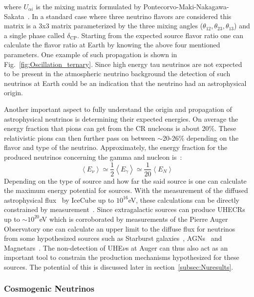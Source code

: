 where $U_{\alpha i}$ is the mixing matrix formulated by Pontecorvo-Maki-Nakagawa-Sakata~\cite{Pontecorvo:1957qd,10.1143/PTP.28.870}. In a standard case where three neutrino flavors are considered this matrix is a 3x3 matrix parameterized by the three mixing angles ($\theta_{12},\theta_{23},\theta_{13}$) and a single phase called $\delta_{\text{CP}}$. Starting from the expected source flavor ratio one can calculate the flavor ratio at Earth by knowing the above four mentioned parameters. One example of such propagation is shown in Fig.~\ref{fig:Oscillation_ternary}. Since high energy tau neutrinos are not expected to be present in the atmospheric neutrino background the detection of such neutrinos at Earth could be an indication that the neutrino had an astrophysical origin. 

Another important aspect to fully understand the origin and propagation of astrophysical neutrinos is determining their expected energies. On average the energy fraction that pions can get from the \gls*{CR} nucleons is about 20\%. These relativistic pions can then further pass on between $\sim$20-26\% depending on the flavor and type of the neutrino. Approximately, the energy fraction for the produced neutrinos concerning the gamma and nucleon is~\cite{Lipari_2007}:
\begin{equation}
  \left\langle E_{\nu} \right\rangle  \simeq  \frac{1}{2}\left\langle E_{\gamma} \right\rangle \simeq  \frac{1}{20}\left\langle E_{N} \right\rangle
\end{equation}
Depending on the type of source and how far the said source is one can calculate the maximum energy potential for sources. With the measurement of the diffused astrophysical flux~\cite{PhysRevD.110.022001} by IceCube up to $10^{16}$eV, these calculations can be directly constrained by measurement~\cite{Abbasi_2023_supernova_emission}. Since extragalactic sources can produce \glspl{UHECR} up to $\sim 10^{20}$eV which is corroborated by measurements of the Pierre Auger Observatory one can calculate an upper limit to the diffuse flux for neutrinos from some hypothesized sources such as Starburst galaxies~\cite{Condorelli_2023_starburst}, AGNs~\cite{Murase_2023} and Magnetars~\cite{2003ApJ...595..346Z}. The non-detection of UHE$\nu$s at Auger can thus also act as an important tool to constrain the production mechanisms hypothesized for these sources. The potential of this is discussed later in section~\ref{subsec:Nuresults}.   

\subsubsection*{Cosmogenic Neutrinos}
\label{subsubsec:CosmoNu}

